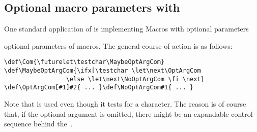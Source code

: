 \subsection{Optional macro parameters with \protect{}}

One standard application of  is implementing
\howto Macros with optional parameters\par
optional parameters of macros. The general course of action
is as follows:
\begin{verbatim}
\def\Com{\futurelet\testchar\MaybeOptArgCom}
\def\MaybeOptArgCom{\ifx[\testchar \let\next\OptArgCom 
                 \else \let\next\NoOptArgCom \fi \next}
\def\OptArgCom[#1]#2{ ... }\def\NoOptArgCom#1{ ... }
\end{verbatim}
Note that  is used even though it tests
for a character. The reason is of course that,
if the optional argument is omitted, there might be an
expandable control sequence behind the~.

